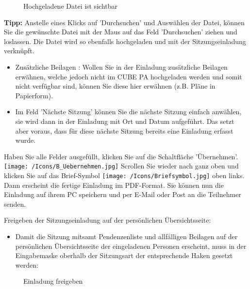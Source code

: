 \begin{figure}[H]
\caption{Hochgeladene Datei ist sichtbar}
\end{figure}

\textbf{Tipp:} Anstelle eines Klicks auf 'Durchsuchen' und Auswählen der Datei, können Sie die gewünschte Datei mit der Maus auf das Feld 'Durchsuchen' ziehen und loslassen. Die Datei wird so ebenfalls hochgeladen und mit der Sitzungseinladung verknüpft.

\vspace{\baselineskip}

\begin{itemize}
\item 
Zusätzliche Beilagen : Wollen Sie in der Einladung zusätzliche Beilagen erwähnen, welche jedoch nicht im CUBE PA hochgeladen werden und somit nicht verfügbar sind, können Sie diese hier erwähnen (z.B. Pläne in Papierform).
\item 
Im Feld 'Nächste Sitzung' können Sie die nächste Sitzung einfach anwählen, sie wird dann in der Einladung mit Ort und Datum aufgeführt. Das setzt aber voraus, dass für diese nächste Sitzung bereits eine Einladung erfasst wurde.
\end{itemize}

Haben Sie alle Felder ausgefüllt, klicken Sie auf die Schaltfläche 'Übernehmen'. \texttt{[image: /Icons/B\_Uebernehmen.jpg]} \newline
Scrollen Sie wieder nach ganz oben und klicken Sie auf das Brief-Symbol \texttt{[image: /Icons/Briefsymbol.jpg]} oben links. Dann erscheint die fertige Einladung im PDF-Format. Sie können nun die Einladung auf ihrem PC speichern und per E-Mail oder Post an die Teilnehmer senden.

\vspace{\baselineskip}

Freigeben der Sitzungseinladung auf der persönlichen Übersichtsseite:

\begin{itemize}
\item
Damit die Sitzung mitsamt Pendenzenliste und allfälligen Beilagen auf der persönlichen Übersichtsseite der eingeladenen Personen erscheint, muss in der Eingabemaske oberhalb der Sitzungsart der entsprechende Haken gesetzt werden:
\end{itemize}

\begin{figure}[H]
\caption{Einladung freigeben}
\end{figure}

